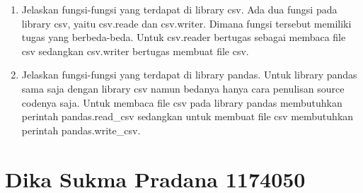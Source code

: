 \begin{enumerate}
\item Jelaskan fungsi-fungsi yang terdapat di library csv.
	\subitem Ada dua fungsi pada library csv, yaitu csv.reade dan csv.writer. Dimana fungsi tersebut memiliki tugas yang berbeda-beda. Untuk csv.reader bertugas sebagai membaca file csv sedangkan csv.writer bertugas membuat file csv.

\item Jelaskan fungsi-fungsi yang terdapat di library pandas.
	\subitem Untuk library pandas sama saja dengan library csv namun bedanya hanya cara penulisan source codenya saja. Untuk membaca file csv pada library pandas membutuhkan perintah pandas.read\_csv sedangkan untuk membuat file csv membutuhkan perintah pandas.write\_csv.

\end{enumerate}

\section{Dika Sukma Pradana 1174050}

